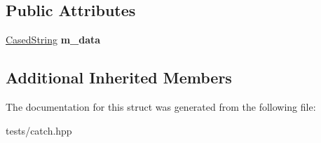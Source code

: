 \subsection*{Public Attributes}
\begin{DoxyCompactItemize}
\item 
\mbox{\label{struct_catch_1_1_matchers_1_1_impl_1_1_std_string_1_1_ends_with_a344d8433f3ba3e0de301ab16ed6dd746}} 
\hyperlink{struct_catch_1_1_matchers_1_1_impl_1_1_std_string_1_1_cased_string}{Cased\+String} {\bfseries m\+\_\+data}
\end{DoxyCompactItemize}
\subsection*{Additional Inherited Members}


The documentation for this struct was generated from the following file\+:\begin{DoxyCompactItemize}
\item 
tests/catch.\+hpp\end{DoxyCompactItemize}
